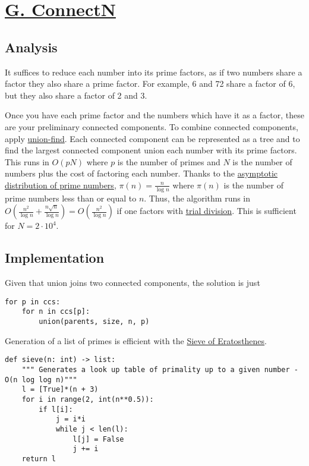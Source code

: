 \documentclass[11pt, oneside]{article}
\begin{document}
\newpage

\section{\href{https://codeforces.com/group/M4wsRWBHyZ/contest/259141/problem/G}{G. ConnectN}}

\subsection{Analysis}

It suffices to reduce each number into its prime factors, as if two numbers share a factor
they also share a prime factor. For example, 6 and 72 share a factor of 6, but they also
share a factor of 2 and 3.

Once you have each prime factor and the numbers which have it as a factor,
these are your preliminary connected components. To combine connected components,
apply \href{https://activities.tjhsst.edu/sct/lectures/1920/2019_10_18_Union_Find_and_MST.pdf}{union-find}.
Each connected component can be represented as a tree and to find the largest connected component
union each number with its prime factors. This runs in \( O(p N ) \) where \( p \) is the number
of primes and \( N \) is the number of numbers plus the cost of factoring each number. Thanks to the \href{https://en.wikipedia.org/wiki/Prime_number_theorem}{asymptotic distribution of prime numbers},
\( \pi(n) = \frac{n}{\log n} \) where \( \pi(n) \) is the number of prime numbers less than or equal to \( n \).
Thus, the algorithm runs in \(O (\frac{n^2}{\log n} + \frac{n \sqrt{n}}{\log n}) = O (\frac{n^2}{\log n}) \)
if one factors with \href{https://en.wikipedia.org/wiki/Trial_division}{trial division}.
This is sufficient for \( N = 2 \cdot 10^4 \).

\subsection{Implementation}

Given that union joins two connected components, the solution is just

\begin{verbatim}
for p in ccs:
    for n in ccs[p]:
        union(parents, size, n, p)
\end{verbatim}

Generation of a list of primes is efficient with the \href{https://en.wikipedia.org/wiki/Sieve_of_Eratosthenes}{Sieve of Eratosthenes}.
\begin{verbatim}
def sieve(n: int) -> list:
    """ Generates a look up table of primality up to a given number - O(n log log n)"""
    l = [True]*(n + 3)
    for i in range(2, int(n**0.5)):
        if l[i]:
            j = i*i
            while j < len(l):
                l[j] = False
                j += i
    return l
\end{verbatim}
\end{document}
